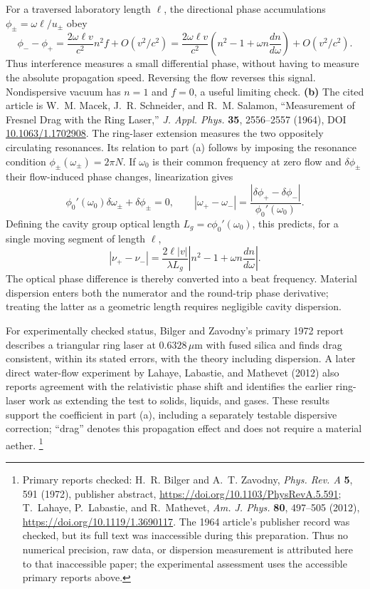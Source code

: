 For a traversed laboratory length $\ell$, the directional phase
accumulations $\phi_\pm=\omega\ell/u_\pm$ obey
\[
\phi_- -\phi_+=\frac{2\omega\ell v}{c^2}n^2f+O(v^2/c^2)
=\frac{2\omega\ell v}{c^2}
\left(n^2-1+\omega n\frac{dn}{d\omega}\right)+O(v^2/c^2).
\]
Thus interference measures a small differential phase, without
having to measure the absolute propagation speed. Reversing the
flow reverses this signal. Nondispersive vacuum has $n=1$ and
$f=0$, a useful limiting check.
\textbf{(b)} The cited article is W.~M. Macek, J.~R. Schneider,
and R.~M. Salamon, ``Measurement of Fresnel Drag with the Ring
Laser,'' \emph{J. Appl. Phys.} \textbf{35}, 2556--2557 (1964),
DOI \href{https://doi.org/10.1063/1.1702908}{10.1063/1.1702908}.
The ring-laser extension measures the two oppositely circulating
resonances. Its relation to part (a) follows by imposing the
resonance condition $\phi_\pm(\omega_\pm)=2\pi N$.
If $\omega_0$ is their common frequency at zero flow and
$\delta\phi_\pm$ their flow-induced phase changes, linearization
gives
\[
\phi_0'(\omega_0)\delta\omega_\pm+\delta\phi_\pm=0,
\qquad
|\omega_+-\omega_-|=
\frac{|\delta\phi_+-\delta\phi_-|}{\phi_0'(\omega_0)}.
\]
Defining the cavity group optical length $L_g=c\phi_0'(\omega_0)$,
this predicts, for a single moving segment of length $\ell$,
\[
|\nu_+-\nu_-|=\frac{2\ell|v|}{\lambda L_g}
\left|n^2-1+\omega n\frac{dn}{d\omega}\right|.
\]
The optical phase difference is thereby converted into a beat
frequency. Material dispersion enters both the numerator and the
round-trip phase derivative; treating the latter as a geometric
length requires negligible cavity dispersion.

For experimentally checked status, Bilger and Zavodny's primary
1972 report describes a triangular ring laser at $0.6328\,\mu$m
with fused silica and finds drag consistent, within its stated
errors, with the theory including dispersion. A later direct
water-flow experiment by Lahaye, Labastie, and Mathevet (2012)
also reports agreement with the relativistic phase shift and
identifies the earlier ring-laser work as extending the test to
solids, liquids, and gases. These results support the coefficient
in part (a), including a separately testable dispersive correction;
``drag'' denotes this propagation effect and does not require a
material aether.
\footnote{Primary reports checked: H.~R. Bilger and A.~T. Zavodny,
\emph{Phys. Rev. A} \textbf{5}, 591 (1972), publisher abstract,
\url{https://doi.org/10.1103/PhysRevA.5.591}; T.~Lahaye,
P.~Labastie, and R.~Mathevet, \emph{Am. J. Phys.} \textbf{80},
497--505 (2012), \url{https://doi.org/10.1119/1.3690117}.
The 1964 article's publisher record was checked, but its full text
was inaccessible during this preparation. Thus no numerical
precision, raw data, or dispersion measurement is attributed here
to that inaccessible paper; the experimental assessment uses the
accessible primary reports above.}

